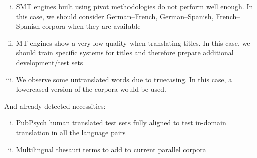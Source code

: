 \documentclass[a4paper,11pt]{article}
\begin{document}
\begin{enumerate}[(i)]
\itemsep0em 
 \item SMT engines built using pivot methodologies do not perform well enough. In this case, we should consider German--French, German--Spanish, French--Spanish corpora when they are available
 \item MT engines show a very low quality when translating titles. In this case, we should train specific systems for titles and therefore prepare additional development/test sets
 \item We observe some untranslated words due to truecasing. In this case, a lowercased version of the corpora would be used.
\end{enumerate}

And already detected necessities:
\begin{enumerate}[(i)]
\itemsep0em 
 \item PubPsych human translated test sets fully aligned to test in-domain translation in all the language pairs
 \item Multilingual thesauri terms to add to current parallel corpora
\end{enumerate}


%
%


\end{document}

